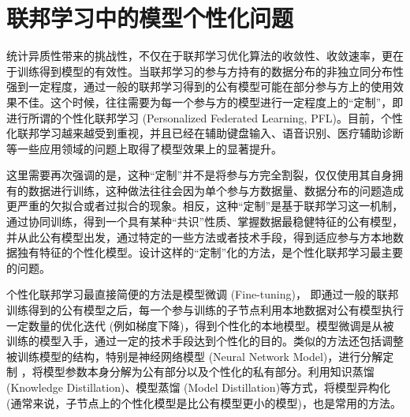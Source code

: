\section{联邦学习中的模型个性化问题}
\label{sec:chap3-pfl}


统计异质性带来的挑战性，不仅在于联邦学习优化算法的收敛性、收敛速率，更在于训练得到模型的有效性\cite{kairouz2019advances_fl}。当联邦学习的参与方持有的数据分布的非独立同分布性强到一定程度，通过一般的联邦学习得到的公有模型可能在部分参与方上的使用效果不佳。这个时候，往往需要为每一个参与方的模型进行一定程度上的``定制''，即进行所谓的个性化联邦学习 (Personalized Federated Learning, PFL)。目前，个性化联邦学习越来越受到重视\cite{Kulkarni_2020_pfl,Tan_2022_pfl}，并且已经在辅助键盘输入\cite{wang2019_pfl}、语音识别\cite{Sim_2019_pfl_audio}、医疗辅助诊断\cite{Tang_2021_pfl_ecg}等一些应用领域的问题上取得了模型效果上的显著提升。

这里需要再次强调的是，这种``定制''并不是将参与方完全割裂，仅仅使用其自身拥有的数据进行训练，这种做法往往会因为单个参与方数据量、数据分布的问题造成更严重的欠拟合或者过拟合的现象。相反，这种``定制''是基于联邦学习这一机制，通过协同训练，得到一个具有某种``共识''性质、掌握数据最稳健特征的公有模型，并从此公有模型出发，通过特定的一些方法或者技术手段，得到适应参与方本地数据独有特征的个性化模型。设计这样的``定制''化的方法，是个性化联邦学习最主要的问题。

个性化联邦学习最直接简便的方法是模型微调 (Fine-tuning)\cite{zhao2018_fl_noniid, Sim_2019_pfl_audio}， 即通过一般的联邦训练得到的公有模型之后，每一个参与训练的子节点利用本地数据对公有模型执行一定数量的优化迭代 (例如梯度下降)，得到个性化的本地模型。模型微调是从被训练的模型入手，通过一定的技术手段达到个性化的目的。类似的方法还包括调整被训练模型的结构，特别是神经网络模型 (Neural Network Model)，进行分解定制\cite{arivazhagan2019_pfl_layer} \cite{Krishna_2022_partial_per_fl}，将模型参数本身分解为公有部分以及个性化的私有部分。利用知识蒸馏 (Knowledge Distillation)\cite{shen2020_fml}、模型蒸馏 (Model Distillation)\cite{li2019_fedmd}等方式，将模型异构化 (通常来说，子节点上的个性化模型是比公有模型更小的模型)，也是常用的方法。

